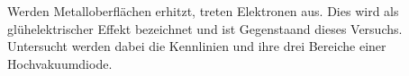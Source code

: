 Werden Metalloberflächen erhitzt, treten Elektronen aus. Dies wird als glühelektrischer Effekt bezeichnet
und ist Gegenstaand dieses Versuchs. Untersucht werden dabei die Kennlinien und ihre drei Bereiche
einer Hochvakuumdiode.
